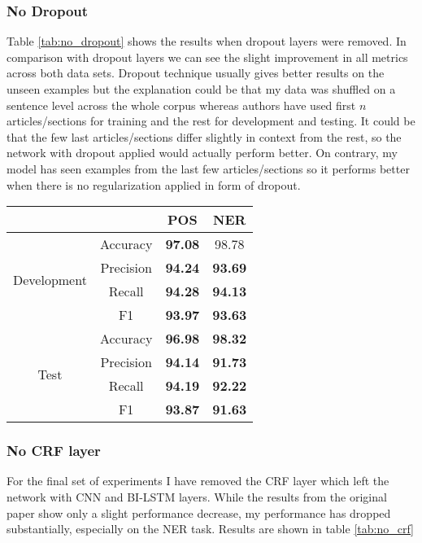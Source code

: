 \label{peculiar_dropout}
\subsubsection{No Dropout}
Table \ref{tab:no_dropout} shows the results when dropout layers were removed.
In comparison with dropout layers we can see the slight improvement in all
metrics across both data sets. Dropout technique usually gives better results
on the unseen examples but the explanation could be that my data was shuffled
on a sentence level across the whole corpus whereas authors have used first $n$
articles/sections for training and the rest for development and testing. It
could be that the few last articles/sections differ slightly in context from
the rest, so the network with dropout applied would actually perform better. On
contrary, my model has seen examples from the last few articles/sections so it
performs better when there is no regularization applied in form of dropout.

\begin{center}
\begin{tabular}{ |c|c|c|c| }
\hline
& & {\textbf{POS}} & {\textbf{NER}}\\ \hline
\multirow{4}{*}{Development} & Accuracy & \textbf{97.08} & 98.78 \\
 & Precision & \textbf{94.24} & \textbf{93.69} \\
 & Recall & \textbf{94.28} & \textbf{94.13} \\
 & F1 & \textbf{93.97} & \textbf{93.63} \\ \hline
\multirow{4}{*}{Test} & Accuracy & \textbf{96.98} & \textbf{98.32} \\
 & Precision & \textbf{94.14} & \textbf{91.73} \\
 & Recall & \textbf{94.19} & \textbf{92.22} \\
 & F1 & \textbf{93.87} & \textbf{91.63} \\ \hline
\end{tabular}
\label{tab:no_dropout}
\end{center}

\subsubsection{No CRF layer}
For the final set of experiments I have removed the CRF layer which left the
network with CNN and BI-LSTM layers. While the results from the original paper
show only a slight performance decrease, my performance has dropped
substantially, especially on the NER task. Results are shown in table
\ref{tab:no_crf}

